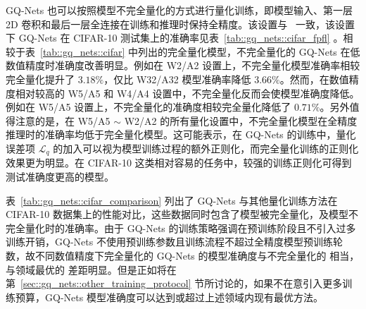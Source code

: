 \documentclass[
  fontset = mac,
]{shtthesis}
\begin{document}
GQ-Nets 也可以按照模型不完全量化的方式进行量化训练，即模型输入、第一层 2D 卷积和最后一层全连接在训练和推理时保持全精度。该设置与~\citet{zhou2016dorefanet, choi2018pact, Zhang_2018, li2019additive} 一致，该设置下 GQ-Nets 在 CIFAR-10 测试集上的准确率见表~\ref{tab::gq_nets::cifar_fpfl} 。相较于表~\ref{tab::gq_nets::cifar} 中列出的完全量化模型，不完全量化的 GQ-Nets 在低数值精度时准确度改善明显。例如在 W2/A2 设置上，不完全量化模型准确率相较完全量化提升了 $3.18\%$，仅比 W32/A32 模型准确率降低 $3.66\%$。然而，在数值精度相对较高的 W5/A5 和 W4/A4 设置中，不完全量化反而会使模型准确度降低。例如在 W5/A5 设置上，不完全量化的准确度相较完全量化降低了 $0.71\%$。另外值得注意的是，在 W5/A5 $\sim$ W2/A2 的所有量化设置中，不完全量化模型在全精度推理时的准确率均低于完全量化模型。这可能表示，在 GQ-Nets 的训练中，量化误差项 $\mathcal{L}_q$ 的加入可以视为模型训练过程的额外正则化，而完全量化训练的正则化效果更为明显。在 CIFAR-10 这类相对容易的任务中，较强的训练正则化可得到测试准确度更高的模型。


表~\ref{tab::gq_nets::cifar_comparison} 列出了 GQ-Nets 与其他量化训练方法在 CIFAR-10 数据集上的性能对比，这些数据同时包含了模型被完全量化，及模型不完全量化时的准确率。由于 GQ-Nets 的训练策略强调在预训练阶段且不引入过多训练开销，GQ-Nets 不使用预训练参数且训练流程不超过全精度模型预训练轮数，故不同数值精度下完全量化的 GQ-Nets 的模型准确度与不完全量化的 \citet{zhou2016dorefanet} 相当，与领域最优的 \citet{Zhang_2018, li2019additive} 差距明显。但是正如将在第~\ref{sec::gq_nets::other_training_protocol} 节所讨论的，如果不在意引入更多训练预算，GQ-Nets 模型准确度可以达到或超过上述领域内现有最优方法。
\end{document}
